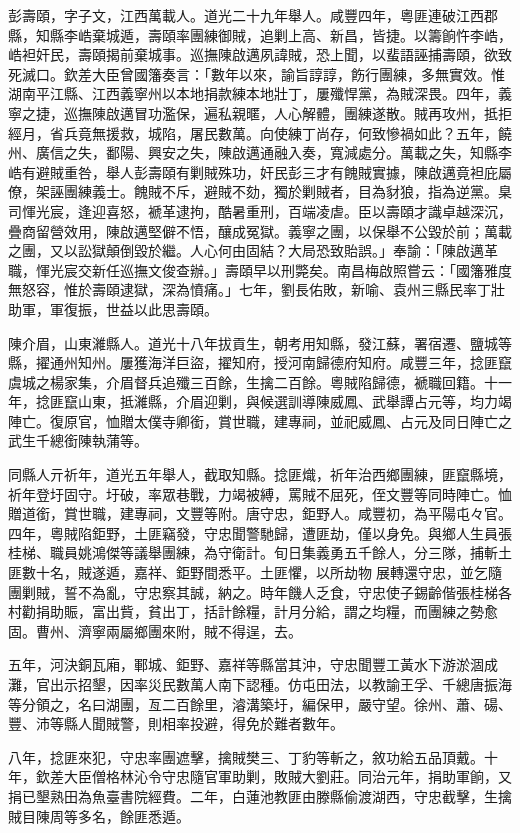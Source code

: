 \begin{pinyinscope}
彭壽頤，字子文，江西萬載人。道光二十九年舉人。咸豐四年，粵匪連破江西郡縣，知縣李峼棄城遁，壽頤率團練御賊，追剿上高、新昌，皆捷。以籌餉忤李峼，峼袒奸民，壽頤揭前棄城事。巡撫陳啟邁夙諱賊，恐上聞，以蜚語誣捕壽頤，欲致死滅口。欽差大臣曾國籓奏言：「數年以來，諭旨諄諄，飭行團練，多無實效。惟湖南平江縣、江西義寧州以本地捐款練本地壯丁，屢殲悍黨，為賊深畏。四年，義寧之捷，巡撫陳啟邁冒功濫保，遍私親暱，人心解體，團練遂散。賊再攻州，抵拒經月，省兵竟無援救，城陷，屠民數萬。向使練丁尚存，何致慘禍如此？五年，饒州、廣信之失，鄱陽、興安之失，陳啟邁通融入奏，寬減處分。萬載之失，知縣李峼有避賊重咎，舉人彭壽頤有剿賊殊功，奸民彭三才有餽賊實據，陳啟邁竟袒庇屬僚，架誣團練義士。餽賊不斥，避賊不劾，獨於剿賊者，目為豺狼，指為逆黨。臬司惲光宸，逢迎喜怒，褫革逮拘，酷暑重刑，百端凌虐。臣以壽頤才識卓越深沉，疊商留營效用，陳啟邁堅僻不悟，釀成冤獄。義寧之團，以保舉不公毀於前；萬載之團，又以訟獄顛倒毀於繼。人心何由固結？大局恐致貽誤。」奉諭：「陳啟邁革職，惲光宸交新任巡撫文俊查辦。」壽頤早以刑斃矣。南昌梅啟照嘗云：「國籓雅度無怒容，惟於壽頤逮獄，深為憤痛。」七年，劉長佑敗，新喻、袁州三縣民率丁壯助軍，軍復振，世益以此思壽頤。

陳介眉，山東濰縣人。道光十八年拔貢生，朝考用知縣，發江蘇，署宿遷、鹽城等縣，擢通州知州。屢獲海洋巨盜，擢知府，授河南歸德府知府。咸豐三年，捻匪竄虞城之楊家集，介眉督兵追殲三百餘，生擒二百餘。粵賊陷歸德，褫職回籍。十一年，捻匪竄山東，抵濰縣，介眉迎剿，與候選訓導陳威鳳、武舉譚占元等，均力竭陣亡。復原官，恤贈太僕寺卿銜，賞世職，建專祠，並祀威鳳、占元及同日陣亡之武生千總銜陳執蒲等。

同縣人亓祈年，道光五年舉人，截取知縣。捻匪熾，祈年治西鄉團練，匪竄縣境，祈年登圩固守。圩破，率眾巷戰，力竭被縛，罵賊不屈死，侄文豐等同時陣亡。恤贈道銜，賞世職，建專祠，文豐等附。唐守忠，鉅野人。咸豐初，為平陽屯々官。四年，粵賊陷鉅野，土匪竊發，守忠聞警馳歸，遭匪劫，僅以身免。與鄉人生員張桂梯、職員姚鴻傑等議舉團練，為守衛計。旬日集義勇五千餘人，分三隊，捕斬土匪數十名，賊遂遁，嘉祥、鉅野間悉平。土匪懼，以所劫物展轉還守忠，並乞隨團剿賊，誓不為亂，守忠察其誠，納之。時年饑人乏食，守忠使子錫齡偕張桂梯各村勸捐助賑，富出貲，貧出丁，括計餘糧，計月分給，謂之均糧，而團練之勢愈固。曹州、濟寧兩屬鄉團來附，賊不得逞，去。

五年，河決銅瓦廂，鄆城、鉅野、嘉祥等縣當其沖，守忠聞豐工黃水下游淤涸成灘，官出示招墾，因率災民數萬人南下認種。仿屯田法，以教諭王孚、千總唐振海等分領之，名曰湖團，亙二百餘里，濬溝築圩，編保甲，嚴守望。徐州、蕭、碭、豐、沛等縣人聞賊警，則相率投避，得免於難者數年。

八年，捻匪來犯，守忠率團遮擊，擒賊樊三、丁豹等斬之，敘功給五品頂戴。十年，欽差大臣僧格林沁令守忠隨官軍助剿，敗賊大劉莊。同治元年，捐助軍餉，又捐已墾熟田為魚臺書院經費。二年，白蓮池教匪由滕縣偷渡湖西，守忠截擊，生擒賊目陳周等多名，餘匪悉遁。


\end{pinyinscope}
